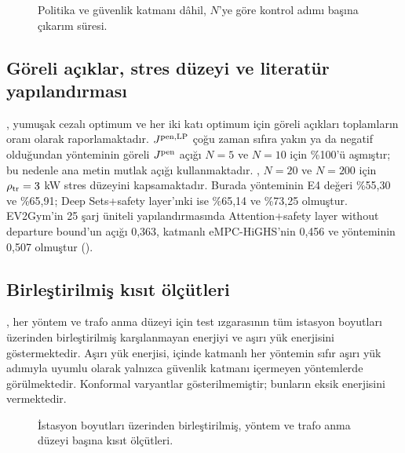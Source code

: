 \begin{figure}[t]
\centering
{}
\caption{Politika ve güvenlik katmanı dâhil, $N$'ye göre kontrol adımı başına çıkarım süresi.}
\label{fig:inference}
\end{figure}


\subsection{Göreli açıklar, stres düzeyi ve literatür yapılandırması}\label{app:res-sensitivity}

, yumuşak cezalı optimum ve her iki katı optimum için göreli açıkları toplamların oranı olarak raporlamaktadır.
$J^{\mathrm{pen,LP}}$ çoğu zaman sıfıra yakın ya da negatif olduğundan \method{} yönteminin göreli $J^{\mathrm{pen}}$ açığı $N=5$ ve $N=10$ için \%100'ü aşmıştır; bu nedenle ana metin mutlak açığı kullanmaktadır.
, $N=20$ ve $N=200$ için $\rho_{\mathrm{tr}}=3$ kW stres düzeyini kapsamaktadır.
Burada \method{} yönteminin E4 değeri \%55,30 ve \%65,91; Deep Sets+safety layer'ınki ise \%65,14 ve \%73,25 olmuştur.
EV2Gym'in 25 şarj üniteli yapılandırmasında Attention+safety layer without departure bound'un açığı 0,363, katmanlı eMPC-HiGHS'nin 0,456 ve \method{} yönteminin 0,507 olmuştur ().


\subsection{Birleştirilmiş kısıt ölçütleri}\label{app:res-example}

, her yöntem ve trafo anma düzeyi için test ızgarasının tüm istasyon boyutları üzerinden birleştirilmiş karşılanmayan enerjiyi ve aşırı yük enerjisini göstermektedir.
Aşırı yük enerjisi,  içinde katmanlı her yöntemin sıfır aşırı yük adımıyla uyumlu olarak yalnızca güvenlik katmanı içermeyen yöntemlerde görülmektedir.
Konformal varyantlar gösterilmemiştir; bunların eksik enerjisini  vermektedir.

\begin{figure}[t]
\centering
{}
\caption{İstasyon boyutları üzerinden birleştirilmiş, yöntem ve trafo anma düzeyi başına kısıt ölçütleri.}
\label{fig:constraintspooled}
\end{figure}
